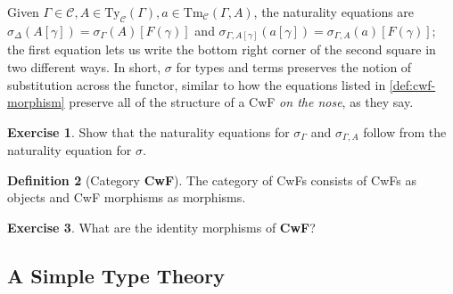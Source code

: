 \documentclass{article}
\renewcommand{\_}{\textrm{\textscale{.5}{\textunderscore}}}
\newcommand{\cat}[1]{\textbf{#1}}
\newcommand{\nt}{\sigma}
\newcommand{\Tm}{\mathrm{Tm}}
\newcommand{\Ty}{\mathrm{Ty}}
\theoremstyle{definition}
\newtheorem{definition}{Definition}[section]
\newtheorem{exercise}[definition]{Exercise}
\theoremstyle{plain}
\begin{document}
Given $\Gamma \in \mathcal{C}, A \in \Ty_{\mathcal{C}}(\Gamma), a \in \Tm_{\mathcal{C}}(\Gamma, A)$,
the naturality equations are $\nt_{\Delta}(A[\gamma]) = \nt_{\Gamma}(A)[F(\gamma)]$
and $\nt_{\Gamma, A[\gamma]}(a[\gamma]) = \nt_{\Gamma, A}(a)[F(\gamma)]$;
the first equation lets us write the bottom right corner of the second square in two different ways.
In short, $\nt$ for types and terms preserves the notion of substitution across the functor,
similar to how the equations listed in \cref{def:cwf-morphism} preserve all of the structure of a CwF
\emph{on the nose}, as they say.

\begin{exercise}
Show that the naturality equations for $\nt_{\Gamma}$ and $\nt_{\Gamma, A}$
follow from the naturality equation for $\nt$.
\end{exercise}

\begin{definition}[Category \cat{CwF}]
The category of CwFs consists of CwFs as objects and CwF morphisms as morphisms.
\end{definition}

\begin{exercise}
What are the identity morphisms of \cat{CwF}?
\end{exercise}

\subsection{A Simple Type Theory}
\end{document}
